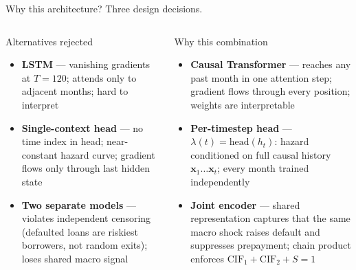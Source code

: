 \documentclass[10pt,aspectratio=169]{beamer}
\begin{document}
\begin{frame}{Why this architecture? Three design decisions.}
    \begin{columns}[T,onlytextwidth]
        \begin{alertblock}{Alternatives rejected}
        \small
        \begin{itemize}\itemsep4pt
            \item \textbf{LSTM} --- vanishing gradients at $T{=}120$; attends only to adjacent months; hard to interpret
            \item \textbf{Single-context head} --- no time index in head; near-constant hazard curve; gradient flows only through last hidden state
            \item \textbf{Two separate models} --- violates independent censoring (defaulted loans are riskiest borrowers, not random exits); loses shared macro signal
        \end{itemize}
        \end{alertblock}

        \begin{block}{Why this combination}
        \small
        \begin{itemize}\itemsep4pt
            \item \textbf{Causal Transformer} --- reaches any past month in one attention step; gradient flows through every position; weights are interpretable
            \item \textbf{Per-timestep head} --- $\lambda(t){=}\text{head}(h_t)$: hazard conditioned on full causal history $\mathbf{x}_1\!\dots\mathbf{x}_t$; every month trained independently
            \item \textbf{Joint encoder} --- shared representation captures that the same macro shock raises default and suppresses prepayment; chain product enforces $\text{CIF}_1{+}\text{CIF}_2{+}S{=}1$
        \end{itemize}
        \end{block}
    \end{columns}
\end{frame}
\end{document}
